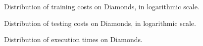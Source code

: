\begin{figure}[h!]
	\centering
	\scalebox{0.9}{}
	\caption{Distribution of training costs on Diamonds, in logarithmic scale.}
	\label{Diamonds_train}
\end{figure}

\begin{figure}[h!]
	\centering
	\scalebox{0.9}{}
	\caption{Distribution of testing costs on Diamonds, in logarithmic scale.}
	\label{Diamonds_test}
\end{figure}

\begin{figure}[h!]
	\centering
	\scalebox{0.9}{}
	\caption{Distribution of execution times on Diamonds.}
	\label{Diamonds_time}
\end{figure}


